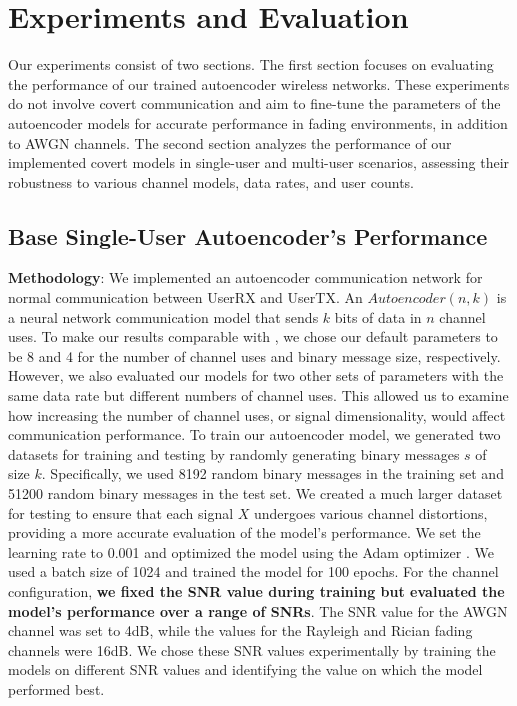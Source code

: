 \section{Experiments and Evaluation}
\label{s:eval}
Our experiments consist of two sections. The first section focuses on evaluating the performance of our trained autoencoder wireless networks. These experiments do not involve covert communication and aim to fine-tune the parameters of the autoencoder models for accurate performance in fading environments, in addition to AWGN channels. The second section analyzes the performance of our implemented covert models in single-user and multi-user scenarios, assessing their robustness to various channel models, data rates, and user counts.

\subsection{Base Single-User Autoencoder's Performance}
\textbf{Methodology}: We implemented an autoencoder communication network for normal communication between UserRX and UserTX. An \(Autoencoder (n, k)\) is a neural network communication model that sends \(k\) bits of data in \(n\) channel uses. To make our results comparable with \cite{o2017introduction}, we chose our default parameters to be 8 and 4 for the number of channel uses and binary message size, respectively. However, we also evaluated our models for two other sets of parameters with the same data rate but different numbers of channel uses. This allowed us to examine how increasing the number of channel uses, or signal dimensionality, would affect communication performance. To train our autoencoder model, we generated two datasets for training and testing by randomly generating binary messages \(s\) of size \(k\). Specifically, we used 8192 random binary messages in the training set and 51200 random binary messages in the test set. We created a much larger dataset for testing to ensure that each signal \(X\) undergoes various channel distortions, providing a more accurate evaluation of the model's performance. We set the learning rate to 0.001 and optimized the model using the Adam optimizer \cite{kingma2014adam}. We used a batch size of 1024 and trained the model for 100 epochs. For the channel configuration, \textbf{we fixed the SNR value during training but evaluated the model's performance over a range of SNRs}. The SNR value for the AWGN channel was set to 4dB, while the values for the Rayleigh and Rician fading channels were 16dB. We chose these SNR values experimentally by training the models on different SNR values and identifying the value on which the model performed best.

